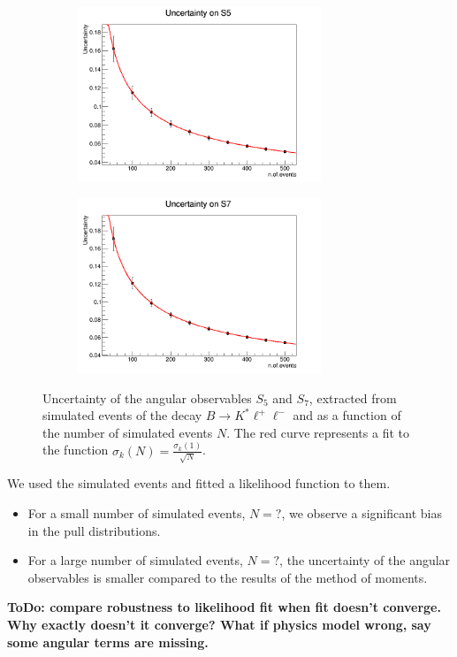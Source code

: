 \documentclass[aps,prd,reprint,nofootinbib,preprintnumbers]{revtex4}
\newcommand{\todo}[1]{{\color{red}\bf ToDo: #1}}
\newcommand{\danny}[1]{{\color{purple}#1}}
\begin{document}
\begin{figure}[t]
        \centering
        \begin{subfigure}[b]{0.45\textwidth}
                \includegraphics[width=0.8\textwidth]{figs/Q2_5_6_S5.png}
        \end{subfigure}
        \begin{subfigure}[b]{0.45\textwidth}
                \includegraphics[width=0.8\textwidth]{figs/Q2_5_6_S7.png}
        \end{subfigure}
        \caption{Uncertainty of the angular observables $S_5$ and $S_7$, extracted from simulated events of the decay $B\to K^*\ell^+\ell^-$ and as a function of the number of simulated events $N$. The red curve represents a fit to the function $\sigma_k(N) = \frac{\sigma_k(1)}{\sqrt{N}}$.}
        \label{fig:errors}
\end{figure}


We used the simulated events and fitted a likelihood function to them.
\begin{itemize}
    \item For a small number of simulated events, \danny{$N=?$}, we observe a significant bias in the pull distributions.
    \item For a large number of simulated events, \danny{$N=?$}, the uncertainty of the angular observables is
        smaller compared to the results of the method of moments.
\end{itemize}
\todo{compare robustness to likelihood fit when fit doesn't
converge. Why exactly doesn't it converge? What if physics model
wrong, say some angular terms are missing.}
\end{document}
